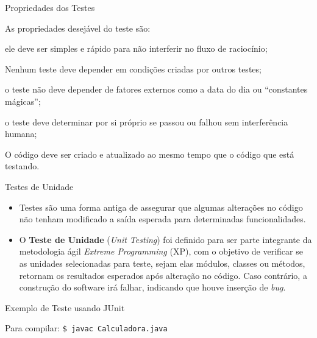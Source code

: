 \begin{frame}{Propriedades dos Testes}

  As propriedades desejável do teste são:
  
  \begin{description}[<+-| alert@+>]
  \item[Rapidez:] ele deve ser simples e rápido para não interferir
    no fluxo de raciocínio;
  \item[Independente:] Nenhum teste deve depender em condições
    criadas por outros testes;
  \item[Reprodutível:] o teste não deve depender de fatores externos
    como a data do dia ou ``constantes mágicas'';
  \item[Automático:] o teste deve determinar por si próprio se passou
    ou falhou sem interferência humana;
  \item[Atualizado:] O código deve ser criado e atualizado ao mesmo
    tempo que o código que está testando.
  \end{description}
  
\end{frame}

\begin{frame}{Testes de Unidade}

\begin{itemize}[<+-| alert@+>]
\item Testes são uma forma antiga de assegurar que algumas alterações 
no código não tenham modificado a saída esperada para determinadas
funcionalidades.
\item O {\bf Teste de Unidade} ({\em Unit Testing}) foi definido para 
ser parte integrante da metodologia ágil {\em Extreme Programming}
(XP), com o objetivo de verificar se as unidades selecionadas para
teste, sejam elas módulos, classes ou métodos, retornam os resultados
esperados após alteração no código. Caso contrário, a construção do
software irá falhar, indicando que houve inserção de {\em bug}.
\end{itemize}

\end{frame}

\lstset{language=java,basicstyle=\scriptsize}
\begin{frame}[fragile]{Exemplo de Teste usando JUnit}



\tiny
Para compilar: {\tt \$ javac Calculadora.java}

\end{frame}


